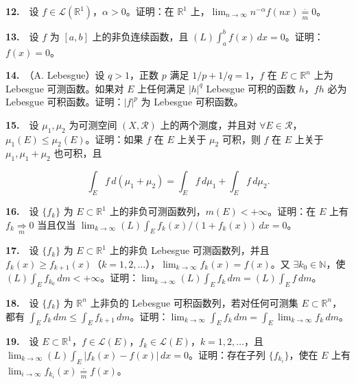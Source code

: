 \documentclass[11pt,a4paper]{article}
\begin{document}
\par{}\noindent \textbf{12.}　设 \(f\in\mathcal L(\mathbb R^1)\)，\(\alpha>0\)。证明：在 \(\mathbb R^1\) 上，\(\lim_{n\to\infty}n^{-\alpha} f(nx)\underset{m}{\overset{\cdot}{=}} 0\)。

\par{}\noindent \textbf{13.}　设 \(f\) 为 \([a,b]\) 上的非负连续函数，且 \((L)\int_a^b f(x)\,dx=0\)。证明：\(f(x)=0\)。

\par{}\noindent \textbf{14.}　（A. Lebesgue）设 \(q>1\)，正数 \(p\) 满足 \(1/p+1/q=1\)，\(f\) 在 \(E\subset\mathbb R^n\) 上为 Lebesgue 可测函数。如果对 \(E\) 上任何满足 \(|h|^q\) Lebesgue 可积的函数 \(h\)，\(fh\) 必为 Lebesgue 可积函数。证明：\(|f|^p\) 为 Lebesgue 可积函数。

\par{}\noindent \textbf{15.}　设 \(\mu_1,\mu_2\) 为可测空间 \((X,\mathcal R)\) 上的两个测度，并且对 \(\forall E\in\mathcal R\)，\(\mu_1(E)\le\mu_2(E)\)。证明：如果 \(f\) 在 \(E\) 上关于 \(\mu_2\) 可积，则 \(f\) 在 \(E\) 上关于 \(\mu_1,\mu_1+\mu_2\) 也可积，且

\[
\int_E f\,d(\mu_1+\mu_2)=\int_E f\,d\mu_1+\int_E f\,d\mu_2.
\]

\par{}\noindent \textbf{16.}　设 \(\{f_k\}\) 为 \(E\subset\mathbb R^1\) 上的非负可测函数列，\(m(E)<+\infty\)。证明：在 \(E\) 上有 \(f_k\underset{m}{\Rightarrow}0\) 当且仅当 \(\lim_{k\to\infty}(L)\int_E f_k(x)/(1+f_k(x))\,dx=0\)。

\par{}\noindent \textbf{17.}　设 \(\{f_k\}\) 为 \(E\subset\mathbb R^1\) 上的非负 Lebesgue 可测函数列，并且 \(f_k(x)\ge f_{k+1}(x)\)（\(k=1,2,\ldots\)），\(\lim_{k\to\infty} f_k(x)=f(x)\)。又 \(\exists k_0\in\mathbb N\)，使 \((L)\int_E f_{k_0}\,dm<+\infty\)。证明：\(\lim_{k\to\infty}(L)\int_E f_k\,dm=(L)\int_E f\,dm\)。

\par{}\noindent \textbf{18.}　设 \(\{f_k\}\) 为 \(\mathbb R^n\) 上非负的 Lebesgue 可积函数列，若对任何可测集 \(E\subset\mathbb R^n\)，都有 \(\int_E f_k\,dm\le\int_E f_{k+1}\,dm\)。证明：\(\lim_{k\to\infty}\int_E f_k\,dm=\int_E\lim_{k\to\infty}f_k\,dm\)。

\par{}\noindent \textbf{19.}　设 \(E\subset\mathbb R^1\)，\(f\in\mathcal L(E)\)，\(f_k\in\mathcal L(E)\)，\(k=1,2,\ldots\)，且 \(\lim_{k\to\infty}(L)\int_E |f_k(x)-f(x)|\,dx=0\)。证明：存在子列 \(\{f_{k_i}\}\)，使在 \(E\) 上有 \(\lim_{i\to\infty}f_{k_i}(x)\underset{m}{\overset{\cdot}{=}} f(x)\)。
\end{document}
